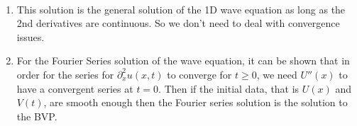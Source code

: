 \documentclass[class=article,crop=false]{standalone}
\begin{document}
\begin{note}[]
~\begin{enumerate}[label=\arabic*)]
	\item This solution is the general solution of the 1D wave equation as long as the 2nd derivatives are continuous. So we don't need to deal with convergence issues.
	\item For the Fourier Series solution of the wave equation, it can be shown that in order for the series for $ \partial^2_x u(x,t)$ to converge for $ t \geq 0$, we need  $ U''(x)$ to have a convergent series at  $ t=0$. Then if the initial data, that is  $ U(x)$ and  $ V(t)$, are smooth enough then the Fourier series solution is the solution to the BVP.
\end{enumerate}
\end{note}
\end{document}
